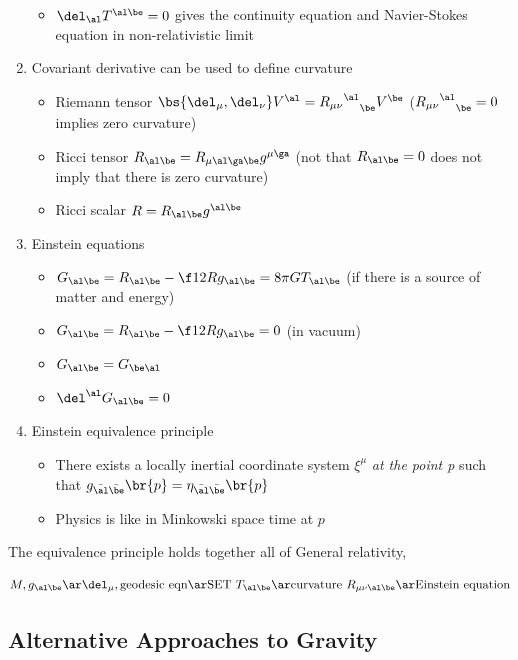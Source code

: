 \documentclass{article}
\begin{document}
\begin{enumerate}
\begin{itemize}
        \item $\del_\al T^{\al\be} = 0$ gives the continuity equation and Navier-Stokes equation in non-relativistic limit
    \end{itemize}
    \item Covariant derivative can be used to define curvature
    \begin{itemize}
        \item Riemann tensor $\bs{\del_\mu, \del_\nu}V^\al = {{R_{\mu\nu}}^\al}_\be V^\be$ (${{R_{\mu\nu}}^\al}_\be=0$ implies zero curvature)
        \item Ricci tensor $R_{\al\be} = R_{\mu\al\ga\be} g^{\mu\ga}$ (not that $R_{\al\be}=0$ does not imply that there is zero curvature)
        \item Ricci scalar $R = R_{\al\be}g^{\al\be}$
    \end{itemize}
    \item Einstein equations
    \begin{itemize}
        \item $G_{\al\be} = R_{\al\be} - \f12 R g_{\al\be} = 8 \pi G T_{\al\be}$ (if there is a source of matter and energy)
        \item $G_{\al\be} = R_{\al\be} - \f12 R g_{\al\be} = 0$ (in vacuum)
        \item $G_{\al\be} = G_{\be\al}$
        \item $\del^\al G_{\al\be} = 0$
    \end{itemize}
    \item Einstein equivalence principle
    \begin{itemize}
        \item There exists a locally inertial coordinate system $\xi^\mu$ \textit{at the point p} such that $g_{\bar{\al}\bar{\be}}\br{p} = \eta_{\bar{\al}\bar{\be}}\br{p}$
        \item Physics is like in Minkowski space time at $p$
    \end{itemize}

\end{enumerate}

The equivalence principle holds together all of General relativity,

\[ M, g_{\al\be} \ar \del_\mu, \text{geodesic eqn} \ar \text{SET } T_{\al\be} \ar \text{curvature } R_{\mu\nu\al\be} \ar \text{Einstein equation} \]

\subsection{Alternative Approaches to Gravity}
\end{document}
